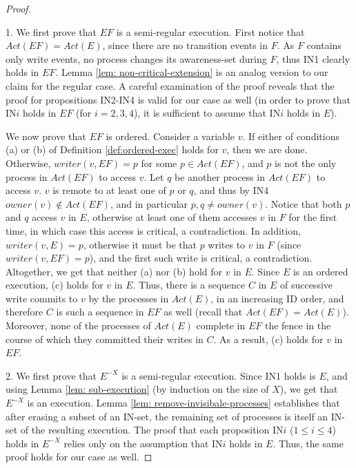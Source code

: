 \begin{proof}
	$ $
	
	1. We first prove that $E F$ is a semi-regular execution. First notice that $Act(E F) = Act(E)$, since there are no transition events in $F$. As $F$ contains only write events, no process changes its awareness-set during $F$, thus IN1 clearly holds in $E F$. Lemma \ref{lem: non-critical-extension} is an analog version to our claim for the regular case. A careful examination of the proof reveals that the proof for propositions IN2-IN4 is valid for our case as well (in order to prove that IN$i$ holds in $E F$ (for $i=2,3,4$), it is sufficient to assume that IN$i$ holds in $E$).
	
	We now prove that $E F$ is ordered. Consider a variable $v$. If either of conditions (a) or (b) of Definition \ref{def:ordered-exec} holds for $v$, then we are done. Otherwise, $writer(v,E F) = p$ for some $p \in Act(E F)$, and $p$ is not the only process in $Act(E F)$ to access $v$. Let $q$ be another process in $Act(E F)$ to access $v$. $v$ is remote to at least one of $p$ or $q$, and thus by IN4 $owner(v) \notin Act(E F)$, and in particular $p,q \neq owner(v)$. Notice that both $p$ and $q$ access $v$ in $E$, otherwise at least one of them accesses $v$ in $F$ for the first time, in which case this access is critical, a contradiction. In addition, $writer(v,E) = p$, otherwise it must be that $p$ writes to $v$ in $F$ (since $writer(v,E F) = p$), and the first such write is critical, a contradiction. Altogether, we get that neither (a) nor (b) hold for $v$ in $E$. Since $E$ is an ordered execution, (c) holds for $v$ in $E$. Thus, there is a sequence $C$ in $E$ of successive write commits to $v$ by the processes in $Act(E)$, in an increasing ID order, and therefore $C$ is such a sequence in $E F$ as well (recall that $Act(E F) = Act(E)$). Moreover, none of the processes of $Act(E)$ complete in $E F$ the fence in the course of which they committed their writes in $C$. As a result, (c) holds for $v$ in $E F$.
	
	2. We first prove that $E^{-X}$ is a semi-regular execution. Since IN1 holds is $E$, and using Lemma \ref{lem: sub-execution} (by induction on the size of $X$), we get that $E^{-X}$ is an execution. Lemma \ref{lem: remove-invisibale-processes} establishes that after erasing a subset of an IN-set, the remaining set of processes is itself an IN-set of the resulting execution. The proof that each proposition IN$i$ ($1 \leq i \leq 4$) holds in $E^{-X}$ relies only on the assumption that IN$i$ holds in $E$. Thus, the same proof holds for our case as well.
	

\end{proof}
